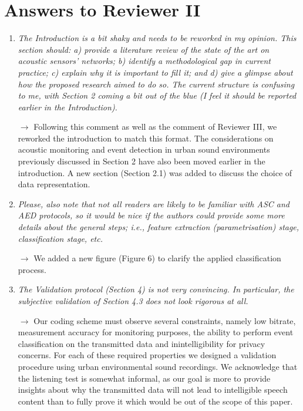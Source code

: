 \documentclass[10pt]{article}
\begin{document}
\section{Answers to Reviewer II}

\begin{enumerate}

\item \emph{The Introduction is a bit shaky and needs to be reworked in my opinion. This section should: a) provide a literature review of the state of the art on acoustic sensors’ networks; b) identify a methodological gap in current practice; c) explain why it is important to fill it; and d) give a glimpse about how the proposed research aimed to do so. The current structure is confusing to me, with Section 2 coming a bit out of the blue (I feel it should be reported earlier in the Introduction).}

$\rightarrow$ Following this comment as well as the comment of Reviewer III, we reworked the introduction to match this format. The considerations on acoustic monitoring and event detection in urban sound environments previously discussed in Section 2 have also been moved earlier in the introduction. A new section (Section 2.1) was added to discuss the choice of data representation.

\item \emph{Please, also note that not all readers are likely to be familiar with ASC and AED protocols, so it would be nice if the authors could provide some more details about the general steps; i.e., feature extraction (parametrisation) stage, classification stage, etc.}

$\rightarrow$ We added a new figure (Figure 6) to clarify the applied classification process.

\item \emph{The Validation protocol (Section 4) is not very convincing. In particular, the subjective validation of Section 4.3 does not look rigorous at all.}

$\rightarrow$ Our coding scheme must observe several constraints, namely low bitrate, measurement accuracy for monitoring purposes, the ability to perform event classification on the transmitted data and inintelligibility for privacy concerns. For each of these required properties we designed a validation procedure using urban environmental sound recordings. We acknowledge that the listening test is somewhat informal, as our goal is more to provide insights about why the transmitted data will not lead to intelligible speech content than to fully prove it which would be out of the scope of this paper.


\end{enumerate}
\end{document}
